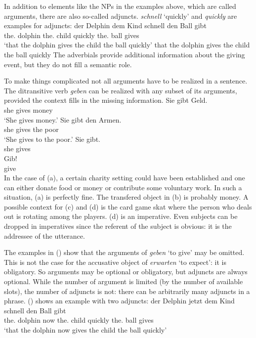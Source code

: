 In addition to elements like the NPs in the examples above, which are called arguments,
there are also so-called adjuncts. \emph{schnell} `quickly' and \emph{quickly} are examples for adjuncts:
\eal
\ex
\gll \dass{} der        Delphin dem        Kind  schnell den        Ball gibt\\
     \that{} the.\NOM{} dolphin the.\DAT{} child quickly the.\ACC{} ball gives\\
\glt `that the dolphin gives the child the ball quickly'
\ex that the dolphin gives the child the ball quickly
\zl
The adverbials provide additional information about the giving event, but they do not fill a
semantic role.

To make things complicated not all arguments have to be realized in a sentence. The ditransitive verb \emph{geben} can be
realized with any subset of its arguments, provided the context fills in the missing information.
\eal
\ex 
\gll Sie gibt Geld.\\
     she gives money\\
\glt `She gives money.'
\ex 
\gll Sie gibt den Armen.\\
     she gives the poor\\
\glt `She gives to the poor.'
\ex\label{ex-sie-gibt} 
\gll Sie gibt.\\
     she gives\\
\ex 
\gll Gib!\\
     give\\
\zl
In the case of (a), a certain charity setting could have been established and one can either
donate food or money or contribute some voluntary work. In such a situation, (a) is perfectly
fine. The transfered object in (b) is probably money. A possible context for (c) and
(d) is the card game skat where the person who deals out is rotating among the
players. (d) is an imperative. Even subjects can be dropped in imperatives since the referent
of the subject is obvious: it is the addressee of the utterance. 

The examples in () show that the arguments of \emph{geben} `to give' may be omitted. This is
not the case for the accusative object of \emph{erwarten} `to expect': it is obligatory. So
arguments may be optional or obligatory, but adjuncts are always optional. While the number of
argument is limited (by the number of available slots), the number of adjuncts is not: there can be
arbitrarily many adjuncts in a phrase. () shows an example with two adjuncts:
\ea
\gll \dass{} der        Delphin jetzt dem        Kind  schnell den        Ball gibt\\
     \that{} the.\NOM{} dolphin now   the.\DAT{} child quickly the.\ACC{} ball gives\\
\glt `that the dolphin now gives the child the ball quickly'
\z

